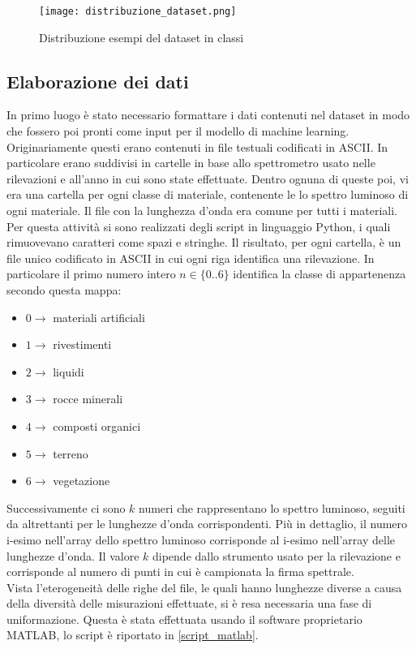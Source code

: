 \begin{figure}
    \centering
    \texttt{[image: distribuzione\_dataset.png]}
    \caption{Distribuzione esempi del dataset in classi}
    \label{distr_esempi}
\end{figure}

\subsection{Elaborazione dei dati}
In primo luogo è stato necessario formattare i dati contenuti nel dataset in modo che fossero poi pronti come input per il modello di machine learning. Originariamente questi erano contenuti in file testuali codificati in ASCII. In particolare erano suddivisi in cartelle in base allo spettrometro usato nelle rilevazioni e all'anno in cui sono state effettuate. Dentro ognuna di queste poi, vi era una cartella per ogni classe di materiale, contenente le lo spettro luminoso di ogni materiale. Il file con la lunghezza d'onda era comune per tutti i materiali. Per questa attività si sono realizzati degli script in linguaggio Python, i quali rimuovevano caratteri come spazi e stringhe. Il risultato, per ogni cartella, è un file unico codificato in ASCII in cui ogni riga identifica una rilevazione. In particolare il primo numero intero $n \in \{ 0 .. 6 \}$ identifica la classe di appartenenza secondo questa mappa:
\begin{itemize}
    \item $0 \rightarrow$ materiali artificiali
    \item $1 \rightarrow$ rivestimenti
    \item $2 \rightarrow$ liquidi
    \item $3 \rightarrow$ rocce minerali
    \item $4 \rightarrow$ composti organici
    \item $5 \rightarrow$ terreno
    \item $6 \rightarrow$ vegetazione
\end{itemize}
Successivamente ci sono $k$ numeri che rappresentano lo spettro luminoso, seguiti da altrettanti per le lunghezze d'onda corrispondenti. Più in dettaglio, il numero i-esimo nell'array dello spettro luminoso corrisponde al i-esimo nell'array delle lunghezze d'onda. Il valore $k$ dipende dallo strumento usato per la rilevazione e corrisponde al numero di punti in cui è campionata la firma spettrale.\\
Vista l'eterogeneità delle righe del file, le quali hanno lunghezze diverse a causa della diversità delle misurazioni effettuate, si è resa necessaria una fase di uniformazione. Questa è stata effettuata usando il software proprietario MATLAB, lo script è riportato in \ref{script_matlab}.

